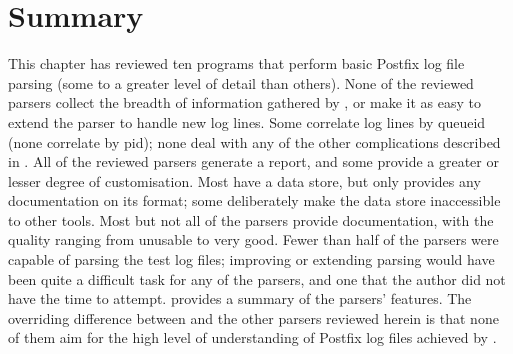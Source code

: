 \section{Summary}

This chapter has reviewed ten programs that perform basic Postfix log file
parsing (some to a greater level of detail than others).   None of the
reviewed parsers collect the breadth of information gathered by
\parsername{}, or make it as easy to extend the parser to handle new log
lines.  Some correlate log lines by queueid (none correlate by pid); none
deal with any of the other complications described in
.  All of the reviewed parsers generate a report,
and some provide a greater or lesser degree of customisation.  Most have a
data store, but only  provides any documentation on its
format; some deliberately make the data store inaccessible to other tools.
Most but not all of the parsers provide documentation, with the quality
ranging from unusable to very good.  Fewer than half of the parsers were
capable of parsing the \numberOFlogFILES{} test log files; improving or
extending parsing would have been quite a difficult task for any of the
parsers, and one that the author did not have the time to attempt.
 provides a summary of the parsers'
features.  The overriding difference between \parsername{} and the other
parsers reviewed herein is that none of them aim for the high level of
understanding of Postfix log files achieved by \parsername{}.



